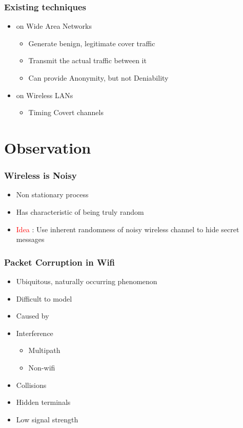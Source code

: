 \documentclass{beamer}
\begin{document}
\begin{frame}
  \frametitle{Existing techniques}
    \begin{itemize}
    \item on Wide Area Networks
      \begin{itemize}
        \item Generate benign, legitimate cover traffic
        \item Transmit the actual traffic between it
        \item Can provide Anonymity, but not Deniability
      \end{itemize}
    \item on Wireless LANs
      \begin{itemize}
      \item Timing Covert channels
      \end{itemize}
    \end{itemize}
\end{frame}

\section{Observation}
\begin{frame}
  \frametitle{Wireless is Noisy}
    \begin{itemize}
    \item Non stationary process
    \item Has characteristic of being truly random
    \item \textcolor{red}{Idea} : Use inherent randomness of noisy wireless channel to
      hide secret messages


    \end{itemize}
\end{frame}

\begin{frame}
  \frametitle{Packet Corruption in Wifi }
    \begin{itemize}
    \item Ubiquitous, naturally occurring phenomenon
    \item Difficult to model
    \item    Caused by
    \item Interference
      \begin{itemize}
      \item Multipath 
      \item Non-wifi
      \end{itemize}
    \item Collisions
    \item Hidden terminals
    \item Low signal strength
    \end{itemize}
\end{frame}
\end{document}
